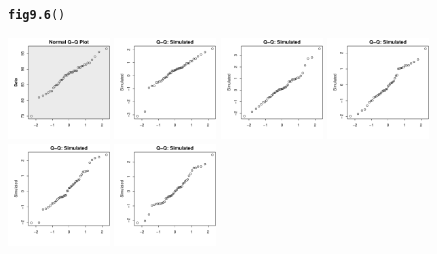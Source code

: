 \documentclass[12pt, a4paper,  BCOR=8.25mm, DIV=15]{scrartcl}\usepackage[]{graphicx}\usepackage[]{color}
\makeatletter
\newcommand{\hlstd}[1]{\textcolor[rgb]{0.345,0.345,0.345}{#1}}%
\newcommand{\hlkwd}[1]{\textcolor[rgb]{0.737,0.353,0.396}{\textbf{#1}}}%
\newenvironment{kframe}{%
 \def\at@end@of@kframe{}%
 \ifinner\ifhmode%
  \def\at@end@of@kframe{\end{minipage}}%
  \begin{minipage}{\columnwidth}%
 \fi\fi%
 \def\FrameCommand##1{\hskip\@totalleftmargin \hskip-\fboxsep
 \colorbox{shadecolor}{##1}\hskip-\fboxsep
     \hskip-\linewidth \hskip-\@totalleftmargin \hskip\columnwidth}%
 \MakeFramed {\advance\hsize-\width
   \@totalleftmargin\z@ \linewidth\hsize
   \@setminipage}}%
 {\par\unskip\endMakeFramed%
 \at@end@of@kframe}
\newenvironment{knitrout}{}{} %
\makeatother
\begin{document}
\begin{figure}[ht]
\begin{knitrout}
\color{fgcolor}\begin{kframe}
\begin{alltt}
\hlkwd{fig9.6}\hlstd{()}
\end{alltt}
\end{kframe}

{\centering \includegraphics[width=0.24\textwidth]{figs/gph-fig9_6e-1} 
\includegraphics[width=0.24\textwidth]{figs/gph-fig9_6e-2} 
\includegraphics[width=0.24\textwidth]{figs/gph-fig9_6e-3} 
\includegraphics[width=0.24\textwidth]{figs/gph-fig9_6e-4} 
\includegraphics[width=0.24\textwidth]{figs/gph-fig9_6e-5} 
\includegraphics[width=0.24\textwidth]{figs/gph-fig9_6e-6} 
}
\end{knitrout}
\end{figure}
\end{document}
